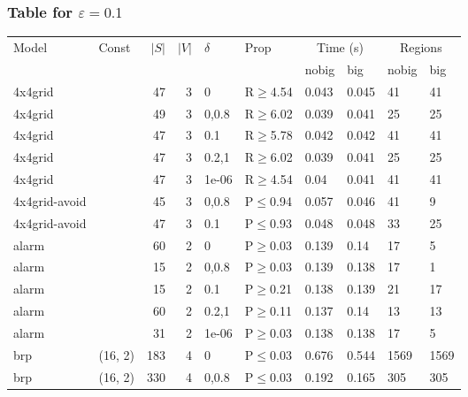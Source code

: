 \subsubsection{Table for \(\varepsilon=0.1\)}
\begin{longtable}{llrrllllll}

        \toprule
        Model & Const & $|S|$ & $|V|$ & $\delta$ & Prop & \multicolumn{2}{c}{Time (s)} & \multicolumn{2}{c}{Regions} \\
        \cmidrule(ll){7-8} \cmidrule(ll){9-10}
        & & & & & & nobig & big & nobig & big \\
        \midrule
        
 4x4grid       &          &     	47 &   3 & 0     & R$\geq$4.54  & 0.043   & 0.045   & 41      & 41   \\
 4x4grid       &          &     	49 &   3 & 0,0.8 & R$\geq$6.02  & 0.039   & 0.041   & 25      & 25   \\
 4x4grid       &          &     	47 &   3 & 0.1   & R$\geq$5.78  & 0.042   & 0.042   & 41      & 41   \\
 4x4grid       &          &     	47 &   3 & 0.2,1 & R$\geq$6.02  & 0.039   & 0.041   & 25      & 25   \\
 4x4grid       &          &     	47 &   3 & 1e-06 & R$\geq$4.54  & 0.04    & 0.041   & 41      & 41   \\
 4x4grid-avoid &          &     	45 &   3 & 0,0.8 & P$\leq$0.94  & 0.057   & 0.046   & 41      & 9    \\
 4x4grid-avoid &          &     	47 &   3 & 0.1   & P$\leq$0.93  & 0.048   & 0.048   & 33      & 25   \\
 alarm         &          &     	60 &   2 & 0     & P$\geq$0.03  & 0.139   & 0.14    & 17      & 5    \\
 alarm         &          &     	15 &   2 & 0,0.8 & P$\geq$0.03  & 0.139   & 0.138   & 17      & 1    \\
 alarm         &          &     	15 &   2 & 0.1   & P$\geq$0.21  & 0.138   & 0.139   & 21      & 17   \\
 alarm         &          &     	60 &   2 & 0.2,1 & P$\geq$0.11  & 0.137   & 0.14    & 13      & 13   \\
 alarm         &          &     	31 &   2 & 1e-06 & P$\geq$0.03  & 0.138   & 0.138   & 17      & 5    \\
 brp           & (16, 2)  &    	183 &   4 & 0     & P$\leq$0.03  & 0.676   & 0.544   & 1569    & 1569 \\
 brp           & (16, 2)  &    	330 &   4 & 0,0.8 & P$\leq$0.03  & 0.192   & 0.165   & 305     & 305  \\

\end{longtable}
